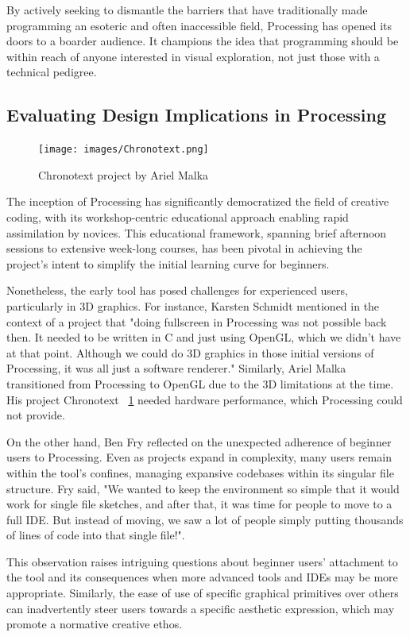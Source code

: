 By actively seeking to dismantle the barriers that have traditionally made programming an esoteric and often inaccessible field, Processing has opened its doors to a boarder audience. It champions the idea that programming should be within reach of anyone interested in visual exploration, not just those with a technical pedigree.

\subsection{Evaluating Design Implications in Processing}

\begin{figure}
  \texttt{[image: images/Chronotext.png]}
  \caption{Chronotext project by Ariel Malka}
  \label{fig:chronotext}
\end{figure}

The inception of Processing has significantly democratized the field of creative coding, with its workshop-centric educational approach enabling rapid assimilation by novices. This educational framework, spanning brief afternoon sessions to extensive week-long courses, has been pivotal in achieving the project's intent to simplify the initial learning curve for beginners. 

Nonetheless, the early tool has posed challenges for experienced users, particularly in 3D graphics. For instance, Karsten Schmidt mentioned in the context of a project that "doing fullscreen in Processing was not possible back then. It needed to be written in C and just using OpenGL, which we didn't have at that point. Although we could do 3D graphics in those initial versions of Processing, it was all just a software renderer." Similarly, Ariel Malka transitioned from Processing to OpenGL due to the 3D limitations at the time. His project Chronotext ~\ref{fig:chronotext} needed hardware performance, which Processing could not provide.

On the other hand, Ben Fry reflected on the unexpected adherence of beginner users to Processing. Even as projects expand in complexity, many users remain within the tool's confines, managing expansive codebases within its singular file structure. Fry said, "We wanted to keep the environment so simple that it would work for single file sketches, and after that, it was time for people to move to a full IDE. But instead of moving, we saw a lot of people simply putting thousands of lines of code into that single file!". 

This observation raises intriguing questions about beginner users' attachment to the tool and its consequences when more advanced tools and IDEs may be more appropriate. Similarly, the ease of use of specific graphical primitives over others can inadvertently steer users towards a specific aesthetic expression, which may promote a normative creative ethos.

